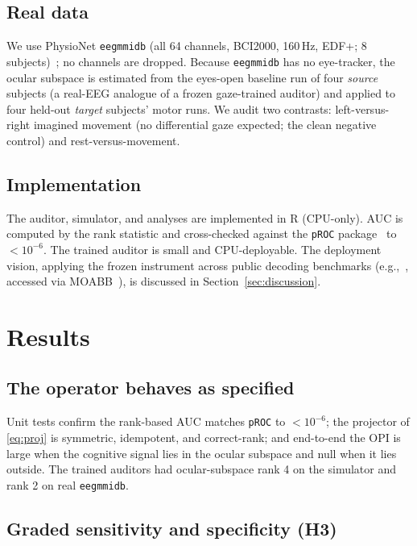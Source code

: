 \documentclass[conference]{IEEEtran}
\begin{document}
\subsection{Real data}

We use PhysioNet \texttt{eegmmidb} (all 64 channels, BCI2000, 160\,Hz, EDF+; 8
subjects)~\cite{schalk2004bci2000,goldberger2000physionet}; no channels are dropped. Because
\texttt{eegmmidb} has no eye-tracker, the ocular subspace is estimated from the eyes-open
baseline run of four \emph{source} subjects (a real-EEG analogue of a frozen gaze-trained
auditor) and applied to four held-out \emph{target} subjects' motor runs. We audit two
contrasts: left-versus-right imagined movement (no differential gaze expected; the clean
negative control) and rest-versus-movement.

\subsection{Implementation}

The auditor, simulator, and analyses are implemented in R (CPU-only). AUC is computed by the
rank statistic and cross-checked against the \texttt{pROC} package~\cite{robin2011proc} to
$<10^{-6}$. The trained auditor is small and CPU-deployable. The
deployment vision, applying the frozen instrument across public decoding benchmarks
(e.g.,~\cite{kappenman2021erpcore,gifford2022thingseeg2,arico2014p300jitter,korczowski2019bi2015a},
accessed via MOABB~\cite{jayaram2018moabb,tangermann2012bcicompetitioniv}), is discussed in
Section~\ref{sec:discussion}.

\section{Results}

\subsection{The operator behaves as specified}

Unit tests confirm the rank-based AUC matches \texttt{pROC} to $<10^{-6}$; the projector of
\eqref{eq:proj} is symmetric, idempotent, and correct-rank; and end-to-end the OPI is large when
the cognitive signal lies in the ocular subspace and null when it lies outside. The trained
auditors had ocular-subspace rank 4 on the simulator and rank 2 on real \texttt{eegmmidb}.



\subsection{Graded sensitivity and specificity (H3)}
\end{document}
